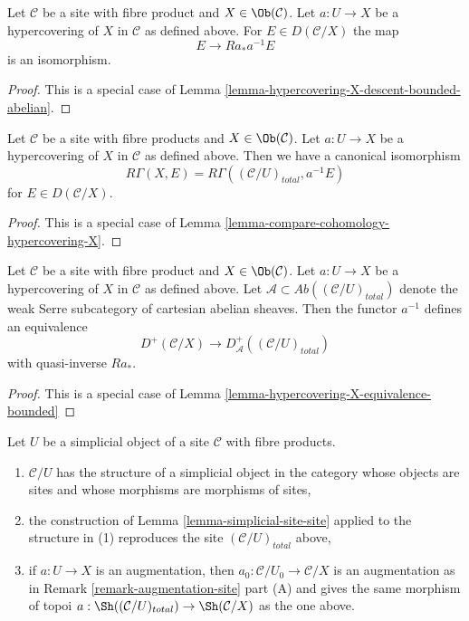 \begin{lemma}
\label{lemma-hypercovering-X-simple-descent-bounded-abelian}
Let $\mathcal{C}$ be a site with fibre product and $X \in \Ob(\mathcal{C})$.
Let $a : U \to X$ be a hypercovering of $X$ in $\mathcal{C}$ as defined above.
For $E \in D(\mathcal{C}/X)$ the map
$$
E \longrightarrow Ra_*a^{-1}E
$$
is an isomorphism.
\end{lemma}

\begin{proof}
This is a special case of
Lemma \ref{lemma-hypercovering-X-descent-bounded-abelian}.
\end{proof}

\begin{lemma}
\label{lemma-compare-cohomology-hypercovering-X-simple}
Let $\mathcal{C}$ be a site with fibre products and $X \in \Ob(\mathcal{C})$.
Let $a : U \to X$ be a hypercovering of $X$ in $\mathcal{C}$ as defined above.
Then we have a canonical isomorphism
$$
R\Gamma(X, E) = R\Gamma((\mathcal{C}/U)_{total}, a^{-1}E)
$$
for $E \in D(\mathcal{C}/X)$.
\end{lemma}

\begin{proof}
This is a special case of
Lemma \ref{lemma-compare-cohomology-hypercovering-X}.
\end{proof}

\begin{lemma}
\label{lemma-hypercovering-X-simple-equivalence-bounded}
Let $\mathcal{C}$ be a site with fibre product and $X \in \Ob(\mathcal{C})$.
Let $a : U \to X$ be a hypercovering of $X$ in $\mathcal{C}$ as defined above.
Let $\mathcal{A} \subset \textit{Ab}((\mathcal{C}/U)_{total})$
denote the weak Serre subcategory of cartesian abelian sheaves.
Then the functor $a^{-1}$ defines an equivalence
$$
D^+(\mathcal{C}/X) \longrightarrow D_\mathcal{A}^+((\mathcal{C}/U)_{total})
$$
with quasi-inverse $Ra_*$.
\end{lemma}

\begin{proof}
This is a special case of
Lemma \ref{lemma-hypercovering-X-equivalence-bounded}
\end{proof}

\begin{lemma}
\label{lemma-sr-when-fibre-products}
Let $U$ be a simplicial object of a site $\mathcal{C}$
with fibre products.
\begin{enumerate}
\item $\mathcal{C}/U$ has the structure of a simplicial object
in the category whose objects are sites and
whose morphisms are morphisms of sites,
\item the construction of Lemma \ref{lemma-simplicial-site-site}
applied to the structure in (1)
reproduces the site $(\mathcal{C}/U)_{total}$ above,
\item if $a : U \to X$ is an augmentation, then
$a_0 : \mathcal{C}/U_0 \to \mathcal{C}/X$ is an augmentation
as in Remark \ref{remark-augmentation-site} part (A) and gives the
same morphism of topoi
$a : \Sh((\mathcal{C}/U)_{total}) \to \Sh(\mathcal{C}/X)$
as the one above.
\end{enumerate}
\end{lemma}


